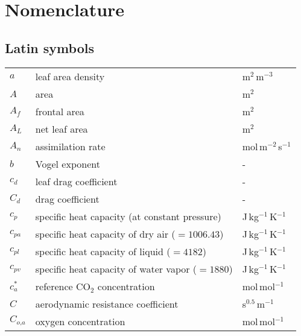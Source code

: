\chapter{Nomenclature}


\section*{Latin symbols}
\begin{longtable}{p{}p{}p{}}
	$a$ & leaf area density & m$^2$\,m$^{-3}$ \\ 	
	$A$ & area & m$^2$ \\ 		
	$A_f$ & frontal area & m$^2$ \\ 		
	$A_L$ & net leaf area & m$^2$ \\ 			
	$A_n$ & assimilation rate & mol\,m$^{-2}$\,s$^{-1}$ \\ 	
	$b$ & Vogel exponent & - \\ 	
	$c_d$ & leaf drag coefficient & - \\ 	
	$C_d$ & drag coefficient & - \\ 		
	$c_p$ & specific heat capacity (at constant pressure) & J\,kg$^{-1}$\,K$^{-1}$ \\ 
	$c_{pa}$ & specific heat capacity of dry air ($=\num{1006.43}$) & J\,kg$^{-1}$\,K$^{-1}$ \\ 	
	$c_{pl}$ & specific heat capacity of liquid ($=\num{4182}$) & J\,kg$^{-1}$\,K$^{-1}$ \\ 		
	$c_{pv}$ & specific heat capacity of water vapor ($=\num{1880}$) & J\,kg$^{-1}$\,K$^{-1}$ \\ 			
	$c_a^*$ & reference CO$_2$ concentration & mol\,mol$^{-1}$ \\ 
	$C$ & aerodynamic resistance coefficient & s$^{0.5}$\,m$^{-1}$\\ 
	$C_{\textit{o,a}}$ & oxygen concentration & mol\,mol$^{-1}$ \\ 

\end{longtable}
